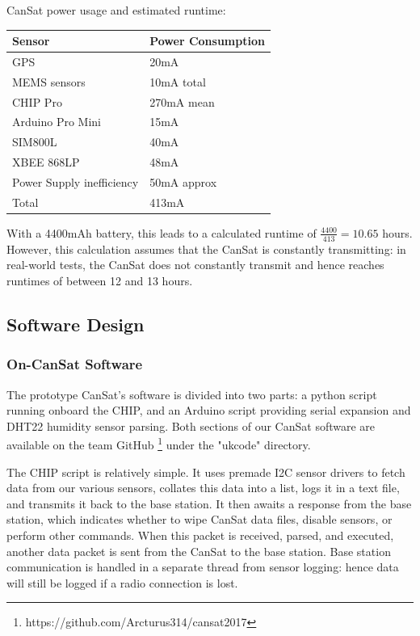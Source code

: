 \documentclass[]{report}
\begin{document}
 		CanSat power usage and estimated runtime:
 		
 		\begin{center}
 			\begin{tabular}{ll}
 				Sensor&Power Consumption\\
 				\hline
 				GPS&20mA \\
 				MEMS sensors&10mA total \\
 				CHIP Pro&270mA mean \\
 				Arduino Pro Mini&15mA \\
 				SIM800L&40mA \\
 				XBEE 868LP&48mA \\
 				Power Supply inefficiency&50mA approx\\
 				\hline
 				Total&413mA
 			\end{tabular}	
 		\end{center}	
 		
 		With a 4400mAh battery, this leads to a calculated runtime of $\frac{4400}{413}=10.65$ hours. However, this calculation assumes that the CanSat is constantly transmitting: in real-world tests, the CanSat does not constantly transmit and hence reaches runtimes of between 12 and 13 hours.
 		
 		\subsection{Software Design}
 		\subsubsection{On-CanSat Software}
 		The prototype CanSat's software is divided into two parts: a python script running onboard the CHIP, and an Arduino script providing serial expansion and DHT22 humidity sensor parsing. Both sections of our CanSat software are available on the team GitHub \footnote{https://github.com/Arcturus314/cansat2017} under the "ukcode" directory.
 		
 		The CHIP script is relatively simple. It uses premade I2C sensor drivers to fetch data from our various sensors, collates this data into a list, logs it in a text file, and transmits it back to the base station. It then awaits a response from the base station, which indicates whether to wipe CanSat data files, disable sensors, or perform other commands. When this packet is received, parsed, and executed, another data packet is sent from the CanSat to the base station. Base station communication is handled in a separate thread from sensor logging: hence data will still be logged if a radio connection is lost.
 		
\end{document}

